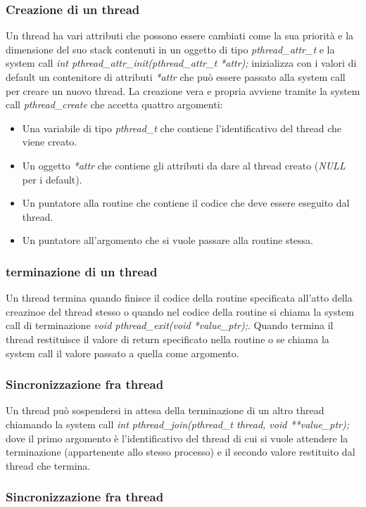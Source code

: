\subsubsection{Creazione di un thread}
Un thread ha vari attributi che possono essere cambiati come la sua priorit\`a e la dimensione del suo stack contenuti in un oggetto di tipo \emph{pthread\_attr\_t} e la system call
\emph{int pthread\_attr\_init(pthread\_attr\_t *attr);} inizializza con i valori di default un contenitore di attributi \emph{*attr} che pu\`o essere passato alla system call per creare
un nuovo thread. La creazione vera e propria avviene tramite la system call \emph{pthread\_create} che accetta quattro argomenti:
\begin{itemize}
	\item Una variabile di tipo \emph{pthread\_t} che contiene l'identificativo del thread che viene creato.
	\item Un oggetto \emph{*attr} che contiene gli attributi da dare al thread creato (\emph{NULL} per i default).
	\item Un puntatore alla routine che contiene il codice che deve essere eseguito dal thread.
	\item Un puntatore all'argomento che si vuole passare alla routine stessa.
\end{itemize}
\subsubsection{terminazione di un thread}
Un thread termina quando finisce il codice della routine specificata all'atto della creazinoe del thread stesso o quando nel codice della routine si chiama la system call di terminazione
\emph{void pthread\_exit(void *value\_ptr);}. Quando termina il thread restituisce il valore di return specificato nella routine o se chiama la system call il valore passato a quella
come argomento. 
\subsubsection{Sincronizzazione fra thread}
Un thread pu\`o sospendersi in attesa della terminazione di un altro thread chiamando la system call \emph{int pthread\_join(pthread\_t thread, void **value\_ptr);} dove il primo 
argomento \`e l'identificativo del thread di cui si vuole attendere la terminazione (appartenente allo stesso processo) e il secondo valore restituito dal thread che termina. 
\subsubsection{Sincronizzazione fra thread}
